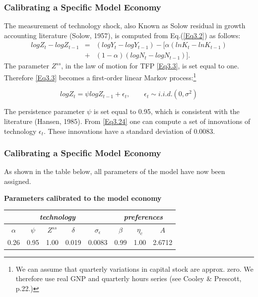 \documentclass[handout]{beamer}
\begin{document}
\begin{frame}

\frametitle{Calibrating a Specific Model Economy}\vskip 0.1in

{\small{

The measurement of technology shock, also Known as Solow residual in
growth accounting literature (Solow, 1957), is computed from Eq.(\ref{Eq3.2}) as follows:
\begin{eqnarray}\label{Eq3.23} \nonumber
logZ_t-logZ_{t-1}&=&(logY_t-logY_{t-1}) - [\alpha(ln{K_t} - ln{K_{t-1}})  \\ 
&+& (1-\alpha)(logN_t-logN_{t-1})].
\end{eqnarray}
The parameter $Z^{ss}$, in the law of motion for TFP \eqref{Eq3.3},
is set equal to one. Therefore \eqref{Eq3.3} becomes a first-order
linear Markov process:\footnote{\scriptsize{We can assume that quarterly variations in capital stock are approx. zero. We therefore use real GNP and quarterly hours series (see Cooley \& Prescott, p.22.)}}

\begin{equation} \label{Eq3.24}
logZ_t=\psi logZ_{t-1} + \epsilon_t,\qquad \epsilon_t\sim
i.i.d.(0,\sigma^2)
\end{equation}

The persistence parameter $\psi$ is set equal to 0.95, which is
consistent with the literature (Hansen, 1985). From \eqref{Eq3.24}
one can compute a set of innovations of technology $\epsilon_t$.
These innovations have a standard deviation of 0.0083. }}
\end{frame}

\begin{frame}

\frametitle{Calibrating a Specific Model Economy}\vskip 0.1in

As shown in the table below, all parameters of the model have now
been assigned.


\begin{center}
\textbf{Parameters calibrated to the model economy}\\\medskip
\begin{tabular}{|c|c|c|c|c|c|c|c|}\hline
\multicolumn{ 5}{|c|}{\textit{technology}} &  \multicolumn{ 3}{c|}{\textit{preferences}} \\
\hline
$\alpha$ & $\psi$ & $Z^{ss}$ & $\delta$ & $\sigma_\epsilon$ & $\beta$ & $\eta_{c}$ & $A$\\
\hline 0.26 & 0.95 & 1.00 & 0.019 & 0.0083 & 0.99 & 1.00 &
2.6712 \\\hline
\end{tabular}
\end{center}


\end{frame}
\end{document}
